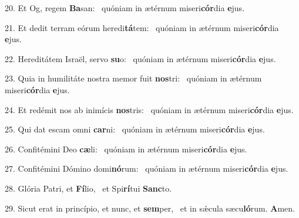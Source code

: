 20. Et Og, regem \textbf{Ba}san: \ast\  quóniam in ætérnum miseri\textbf{cór}dia \textbf{e}jus.\

21. Et dedit terram eórum heredi\textbf{tá}tem: \ast\  quóniam in ætérnum miseri\textbf{cór}dia \textbf{e}jus.\

22. Hereditátem Israël, servo \textbf{su}o: \ast\  quóniam in ætérnum miseri\textbf{cór}dia \textbf{e}jus.\

23. Quia in humilitáte nostra memor fuit \textbf{nos}tri: \ast\  quóniam in ætérnum miseri\textbf{cór}dia \textbf{e}jus.\

24. Et redémit nos ab inimícis \textbf{nos}tris: \ast\  quóniam in ætérnum miseri\textbf{cór}dia \textbf{e}jus.\

25. Qui dat escam omni \textbf{car}ni: \ast\  quóniam in ætérnum miseri\textbf{cór}dia \textbf{e}jus.\

26. Confitémini Deo \textbf{cæ}li: \ast\  quóniam in ætérnum miseri\textbf{cór}dia \textbf{e}jus.\

27. Confitémini Dómino domi\textbf{nó}rum: \ast\  quóniam in ætérnum miseri\textbf{cór}dia \textbf{e}jus.\

28. Glória Patri, et \textbf{Fí}lio, \ast\  et Spi\textbf{rí}tui \textbf{Sanc}to.\

29. Sicut erat in princípio, et nunc, et \textbf{sem}per, \ast\  et in sǽcula sæcu\textbf{ló}rum. \textbf{A}men.\

